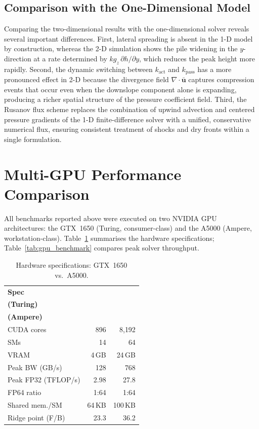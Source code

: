\documentclass[10pt, conference]{FMFP2023}
\begin{document}
\subsection{Comparison with the One-Dimensional Model}

Comparing the two-dimensional results with the one-dimensional solver
reveals several important differences.
First, lateral spreading is absent in the 1-D model by construction,
whereas the 2-D simulation shows the pile widening in the
$y$-direction at a rate determined by $kg_z\,\partial h/\partial y$,
which reduces the peak height more rapidly.
Second, the dynamic switching between $k_{\text{act}}$ and
$k_{\text{pass}}$ has a more pronounced effect in 2-D because the
divergence field $\nabla\cdot\bar{\bm{u}}$ captures compression events
that occur even when the downslope component alone is expanding,
producing a richer spatial structure of the pressure coefficient
field.
Third, the Rusanov flux scheme replaces the combination of upwind
advection and centered pressure gradients of the 1-D finite-difference
solver with a unified, conservative numerical flux, ensuring
consistent treatment of shocks and dry fronts within a single
formulation.

\section{Multi-GPU Performance Comparison}
\label{sec:multigpu}

All benchmarks reported above were executed on two NVIDIA GPU
architectures: the GTX~1650 (Turing, consumer-class) and the
A5000 (Ampere, workstation-class).
Table~\ref{tab:gpu_specs} summarises the hardware specifications;
Table~\ref{tab:gpu_benchmark} compares peak solver throughput.

\begin{table}[htbp]
\caption{Hardware specifications: GTX~1650 vs.\ A5000.}
\label{tab:gpu_specs}
\centering
\begin{tabular}{@{}p{2.8cm}rr@{}}
\toprule
\textbf{Spec}
    & \shortstack[r]{\textbf{GTX~1650}\\\textbf{(Turing)}}
    & \shortstack[r]{\textbf{A5000}\\\textbf{(Ampere)}} \\
\midrule
CUDA cores         & 896    & 8{,}192 \\
SMs                & 14     & 64      \\
VRAM               & 4\,GB  & 24\,GB  \\
Peak BW (GB/s)     & 128    & 768     \\
Peak FP32 (TFLOP/s)& 2.98   & 27.8    \\
FP64 ratio         & 1{:}64 & 1{:}64  \\
Shared mem./SM     & 64\,KB & 100\,KB \\
Ridge point (F/B)  & 23.3   & 36.2    \\
\bottomrule
\end{tabular}
\end{table}
\end{document}
